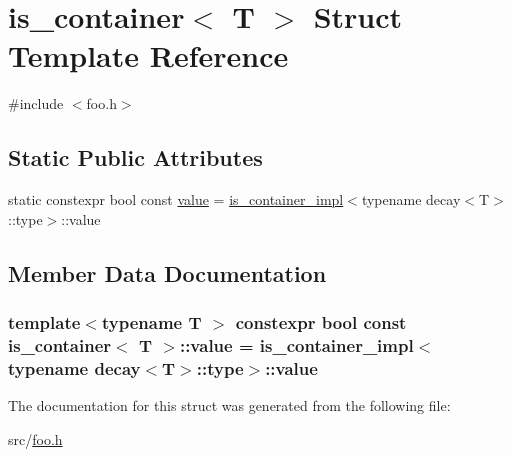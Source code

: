 \hypertarget{structis__container}{\section{is\-\_\-container$<$ T $>$ Struct Template Reference}
\label{structis__container}
}


{\ttfamily \#include $<$foo.\-h$>$}

\subsection*{Static Public Attributes}
\begin{DoxyCompactItemize}
\item 
static constexpr bool const \hyperlink{structis__container_ad9280f39b5748f9729b5dc94ceb836af}{value} = \hyperlink{structis__container__impl}{is\-\_\-container\-\_\-impl}$<$typename decay$<$T$>$\-::type$>$\-::value
\end{DoxyCompactItemize}


\subsection{Member Data Documentation}
\hypertarget{structis__container_ad9280f39b5748f9729b5dc94ceb836af}{
\subsubsection[{value}]{\setlength{\rightskip}{0pt plus 5cm}template$<$typename T $>$ constexpr bool const {\bf is\-\_\-container}$<$ T $>$\-::value = {\bf is\-\_\-container\-\_\-impl}$<$typename decay$<$T$>$\-::type$>$\-::value\hspace{0.3cm}{\ttfamily [static]}}}\label{structis__container_ad9280f39b5748f9729b5dc94ceb836af}


The documentation for this struct was generated from the following file\-:\begin{DoxyCompactItemize}
\item 
src/\hyperlink{foo_8h}{foo.\-h}\end{DoxyCompactItemize}
